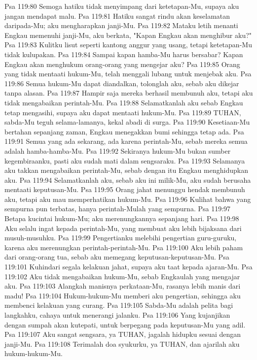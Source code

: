 Psa 119:80  Semoga hatiku tidak menyimpang dari ketetapan-Mu, supaya aku jangan mendapat malu.
Psa 119:81  Hatiku sangat rindu akan keselamatan daripada-Mu; aku mengharapkan janji-Mu.
Psa 119:82  Mataku letih menanti Engkau memenuhi janji-Mu, aku berkata, "Kapan Engkau akan menghibur aku?"
Psa 119:83  Kulitku lisut seperti kantong anggur yang usang, tetapi ketetapan-Mu tidak kulupakan.
Psa 119:84  Sampai kapan hamba-Mu harus bersabar? Kapan Engkau akan menghukum orang-orang yang mengejar aku?
Psa 119:85  Orang yang tidak mentaati hukum-Mu, telah menggali lubang untuk menjebak aku.
Psa 119:86  Semua hukum-Mu dapat diandalkan, tolonglah aku, sebab aku dikejar tanpa alasan.
Psa 119:87  Hampir saja mereka berhasil membunuh aku, tetapi aku tidak mengabaikan perintah-Mu.
Psa 119:88  Selamatkanlah aku sebab Engkau tetap mengasihi, supaya aku dapat mentaati hukum-Mu.
Psa 119:89  TUHAN, sabda-Mu teguh selama-lamanya, kekal abadi di surga.
Psa 119:90  Kesetiaan-Mu bertahan sepanjang zaman, Engkau menegakkan bumi sehingga tetap ada.
Psa 119:91  Semua yang ada sekarang, ada karena perintah-Mu, sebab mereka semua adalah hamba-hamba-Mu.
Psa 119:92  Sekiranya hukum-Mu bukan sumber kegembiraanku, pasti aku sudah mati dalam sengsaraku.
Psa 119:93  Selamanya aku takkan mengabaikan perintah-Mu, sebab dengan itu Engkau menghidupkan aku.
Psa 119:94  Selamatkanlah aku, sebab aku ini milik-Mu, aku sudah berusaha mentaati keputusan-Mu.
Psa 119:95  Orang jahat menunggu hendak membunuh aku, tetapi aku mau memperhatikan hukum-Mu.
Psa 119:96  Kulihat bahwa yang sempurna pun terbatas, hanya perintah-Mulah yang sempurna.
Psa 119:97  Betapa kucintai hukum-Mu; aku merenungkannya sepanjang hari.
Psa 119:98  Aku selalu ingat kepada perintah-Mu, yang membuat aku lebih bijaksana dari musuh-musuhku.
Psa 119:99  Pengertianku melebihi pengertian guru-guruku, karena aku merenungkan perintah-perintah-Mu.
Psa 119:100  Aku lebih paham dari orang-orang tua, sebab aku memegang keputusan-keputusan-Mu.
Psa 119:101  Kuhindari segala kelakuan jahat, supaya aku taat kepada ajaran-Mu.
Psa 119:102  Aku tidak mengabaikan hukum-Mu, sebab Engkaulah yang mengajar aku.
Psa 119:103  Alangkah manisnya perkataan-Mu, rasanya lebih manis dari madu!
Psa 119:104  Hukum-hukum-Mu memberi aku pengertian, sehingga aku membenci kelakuan yang curang.
Psa 119:105  Sabda-Mu adalah pelita bagi langkahku, cahaya untuk menerangi jalanku.
Psa 119:106  Yang kujanjikan dengan sumpah akan kutepati, untuk berpegang pada keputusan-Mu yang adil.
Psa 119:107  Aku sangat sengsara, ya TUHAN, jagalah hidupku sesuai dengan janji-Mu.
Psa 119:108  Terimalah doa syukurku, ya TUHAN, dan ajarilah aku hukum-hukum-Mu.
